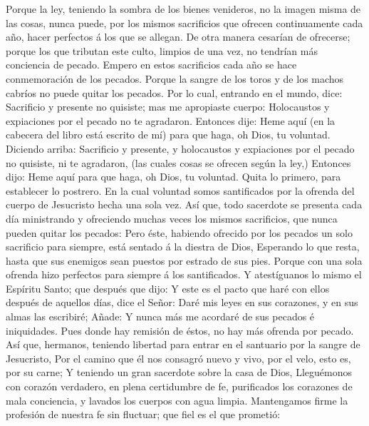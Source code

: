  Porque la ley, teniendo la sombra de los bienes venideros,
no la imagen misma de las cosas, nunca puede, por los mismos sacrificios
que ofrecen continuamente cada año, hacer perfectos á los que se
allegan.  De otra manera cesarían de ofrecerse; porque los
que tributan este culto, limpios de una vez, no tendrían más conciencia
de pecado.  Empero en estos sacrificios cada año se hace
conmemoración de los pecados.  Porque la sangre de los toros
y de los machos cabríos no puede quitar los pecados.  Por lo
cual, entrando en el mundo, dice: Sacrificio y presente no quisiste; mas
me apropiaste cuerpo:  Holocaustos y expiaciones por el
pecado no te agradaron.  Entonces dije: Heme aquí (en la
cabecera del libro está escrito de mí) para que haga, oh Dios, tu
voluntad.  Diciendo arriba: Sacrificio y presente, y
holocaustos y expiaciones por el pecado no quisiste, ni te agradaron,
(las cuales cosas se ofrecen según la ley,)  Entonces dijo:
Heme aquí para que haga, oh Dios, tu voluntad. Quita lo primero, para
establecer lo postrero.  En la cual voluntad somos
santificados por la ofrenda del cuerpo de Jesucristo hecha una sola vez.
 Así que, todo sacerdote se presenta cada día ministrando y
ofreciendo muchas veces los mismos sacrificios, que nunca pueden quitar
los pecados:  Pero éste, habiendo ofrecido por los pecados
un solo sacrificio para siempre, está sentado á la diestra de Dios,
 Esperando lo que resta, hasta que sus enemigos sean
puestos por estrado de sus pies.  Porque con una sola
ofrenda hizo perfectos para siempre á los santificados.  Y
atestíguanos lo mismo el Espíritu Santo; que después que dijo:
 Y este es el pacto que haré con ellos después de aquellos
días, dice el Señor: Daré mis leyes en sus corazones, y en sus almas las
escribiré;  Añade: Y nunca más me acordaré de sus pecados é
iniquidades.  Pues donde hay remisión de éstos, no hay más
ofrenda por pecado.  Así que, hermanos, teniendo libertad
para entrar en el santuario por la sangre de Jesucristo, 
Por el camino que él nos consagró nuevo y vivo, por el velo, esto es,
por su carne;  Y teniendo un gran sacerdote sobre la casa
de Dios,  Lleguémonos con corazón verdadero, en plena
certidumbre de fe, purificados los corazones de mala conciencia, y
lavados los cuerpos con agua limpia.  Mantengamos firme la
profesión de nuestra fe sin fluctuar; que fiel es el que prometió:
